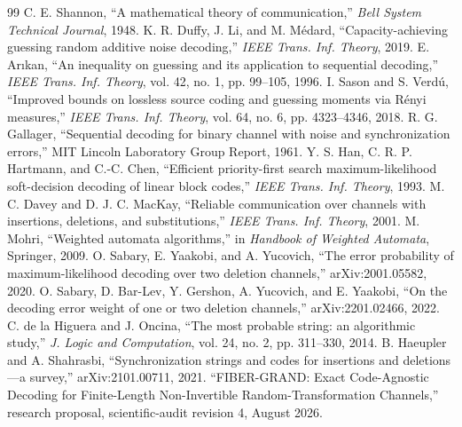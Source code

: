\documentclass[11pt]{article}
\begin{document}
\begin{thebibliography}{99}
 C. E. Shannon, ``A mathematical theory of communication,'' \emph{Bell System Technical Journal}, 1948.
 K. R. Duffy, J. Li, and M. M\'edard, ``Capacity-achieving guessing random additive noise decoding,'' \emph{IEEE Trans. Inf. Theory}, 2019.
 E. Ar\i kan, ``An inequality on guessing and its application to sequential decoding,'' \emph{IEEE Trans. Inf. Theory}, vol. 42, no. 1, pp. 99--105, 1996.
 I. Sason and S. Verd\'u, ``Improved bounds on lossless source coding and guessing moments via R\'enyi measures,'' \emph{IEEE Trans. Inf. Theory}, vol. 64, no. 6, pp. 4323--4346, 2018.
 R. G. Gallager, ``Sequential decoding for binary channel with noise and synchronization errors,'' MIT Lincoln Laboratory Group Report, 1961.
 Y. S. Han, C. R. P. Hartmann, and C.-C. Chen, ``Efficient priority-first search maximum-likelihood soft-decision decoding of linear block codes,'' \emph{IEEE Trans. Inf. Theory}, 1993.
 M. C. Davey and D. J. C. MacKay, ``Reliable communication over channels with insertions, deletions, and substitutions,'' \emph{IEEE Trans. Inf. Theory}, 2001.
 M. Mohri, ``Weighted automata algorithms,'' in \emph{Handbook of Weighted Automata}, Springer, 2009.
 O. Sabary, E. Yaakobi, and A. Yucovich, ``The error probability of maximum-likelihood decoding over two deletion channels,'' arXiv:2001.05582, 2020.
 O. Sabary, D. Bar-Lev, Y. Gershon, A. Yucovich, and E. Yaakobi, ``On the decoding error weight of one or two deletion channels,'' arXiv:2201.02466, 2022.
 C. de la Higuera and J. Oncina, ``The most probable string: an algorithmic study,'' \emph{J. Logic and Computation}, vol. 24, no. 2, pp. 311--330, 2014.
 B. Haeupler and A. Shahrasbi, ``Synchronization strings and codes for insertions and deletions---a survey,'' arXiv:2101.00711, 2021.
 ``FIBER-GRAND: Exact Code-Agnostic Decoding for Finite-Length Non-Invertible Random-Transformation Channels,'' research proposal, scientific-audit revision 4, August 2026.
\end{thebibliography}
\end{document}
